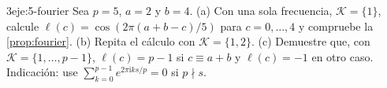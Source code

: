 \begin{ejercicio}{3}{eje:5-fourier}
Sea $p=5$, $a=2$ y $b=4$. (a) Con una sola frecuencia, $\mathcal{K}=\{1\}$, calcule $\ell(c)=\cos(2\pi(a+b-c)/5)$ para $c=0,\dots,4$ y compruebe la \cref{prop:fourier}. (b) Repita el cálculo con $\mathcal{K}=\{1,2\}$. (c) Demuestre que, con $\mathcal{K}=\{1,\dots,p-1\}$, $\ell(c)=p-1$ si $c\equiv a+b$ y $\ell(c)=-1$ en otro caso. Indicación: use $\sum_{k=0}^{p-1}e^{2\pi\mathrm{i}ks/p}=0$ si $p\nmid s$.
\end{ejercicio}
